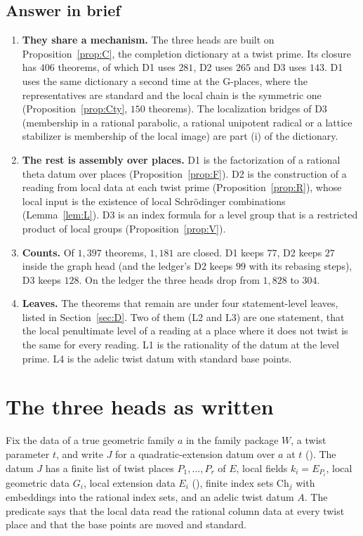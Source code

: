 \documentclass[11pt]{article}
\theoremstyle{definition}
\theoremstyle{remark}
\begin{document}
\subsection{Answer in brief}
\begin{enumerate}[leftmargin=*,itemsep=2pt]
\item \textbf{They share a mechanism.} The three heads are built on Proposition~\ref{prop:C}, the completion dictionary at a twist prime. Its closure has $406$ theorems, of which D1 uses $281$, D2 uses $265$ and D3 uses $143$. D1 uses the same dictionary a second time at the G-places, where the representatives are standard and the local chain is the symmetric one (Proposition~\ref{prop:Cty}, $150$ theorems). The localization bridges of D3 (membership in a rational parabolic, a rational unipotent radical or a lattice stabilizer is membership of the local image) are part (i) of the dictionary.
\item \textbf{The rest is assembly over places.} D1 is the factorization of a rational theta datum over places (Proposition~\ref{prop:F}). D2 is the construction of a reading from local data at each twist prime (Proposition~\ref{prop:R}), whose local input is the existence of local Schr\"odinger combinations (Lemma~\ref{lem:L}). D3 is an index formula for a level group that is a restricted product of local groups (Proposition~\ref{prop:V}).
\item \textbf{Counts.} Of $1{,}397$ theorems, $1{,}181$ are closed. D1 keeps $77$, D2 keeps $27$ inside the graph head (and the ledger's D2 keeps $99$ with its rebasing steps), D3 keeps $128$. On the ledger the three heads drop from $1{,}828$ to $304$.
\item \textbf{Leaves.} The theorems that remain are under four statement-level leaves, listed in Section~\ref{sec:D}. Two of them (L2 and L3) are one statement, that the local penultimate level of a reading at a place where it does not twist is the same for every reading. L1 is the rationality of the datum at the level prime. L4 is the adelic twist datum with standard base points.
\end{enumerate}

\section{The three heads as written}\label{sec:heads}

Fix the data of a true geometric family $a$ in the family package $W$, a twist parameter $t$, and write $J$ for a quadratic-extension datum over $a$ at $t$ (). The datum $J$ has a finite list of twist places $P_1,\dots,P_r$ of $E$, local fields $k_i=E_{P_i}$, local geometric data $G_i$, local extension data $E_i$ (), finite index sets $\mathrm{Ch}_j$ with embeddings into the rational index sets, and an adelic twist datum $A$. The predicate  says that the local data read the rational column data at every twist place and that the base points are moved and standard.
\end{document}
